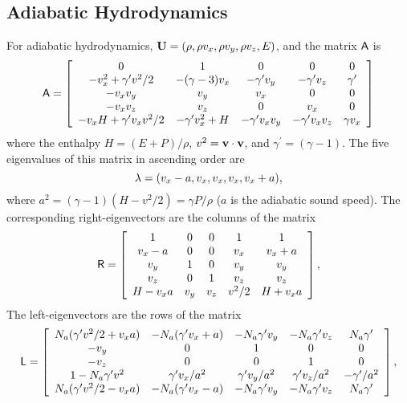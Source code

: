\subsection{Adiabatic Hydrodynamics}

For adiabatic hydrodynamics, ${\bf U} = (\rho, \rho v_{x}, \rho v_{y},
\rho v_{z}, E)$, and the matrix ${\sf A}$ is
\begin{equation}
{\sf A}  = \left[ \begin{array}{ccccc}
0 & 1 & 0 & 0 & 0 \\
-v_{x}^{2} + \gamma^{\prime}v^{2}/2 & -(\gamma -3)v_{x} & -\gamma^{\prime}v_{y} & -\gamma^{\prime}v_{z} & \gamma^{\prime} \\
-v_{x}v_{y} & v_{y} & v_{x} & 0 & 0 \\
-v_{x}v_{z} & v_{z} & 0 & v_{x} & 0 \\
-v_{x}H + \gamma^{\prime}v_{x}v^{2}/2 & -\gamma^{\prime}v_{x}^{2} + H & -\gamma^{\prime}v_{x}v_{y} & -\gamma^{\prime}v_{x}v_{z} & \gamma v_{x} \end{array} \right]
\end{equation}
where the enthalpy $H = (E+P)/\rho$, $v^{2} = {\bf v}\cdot{\bf v}$, and
$\gamma^{\prime} = (\gamma -1)$.  The five eigenvalues of this matrix
in ascending order are
\begin{equation}
{\bf \lambda} = (v_{x}-a, v_{x}, v_{x}, v_{x}, v_{x}+a),
\end{equation}
where $a^{2} = (\gamma-1)(H-v^{2}/2) = \gamma P/\rho$ ($a$ is the
adiabatic sound speed).  The corresponding right-eigenvectors are the
columns of the matrix
\begin{equation}
{\sf R}  = \left[ \begin{array}{ccccc}
1         & 0     & 0     & 1       & 1         \\ 
v_{x} - a & 0     & 0     & v_{x}   & v_{x} + a \\
v_{y}     & 1     & 0     & v_{y}   & v_{y}     \\
v_{z}     & 0     & 1     & v_{z}   & v_{z}     \\
H-v_{x}a  & v_{y} & v_{z} & v^{2}/2 & H+v_{x}a  \end{array} \right] ,
\end{equation}
The left-eigenvectors are the rows of the matrix
\begin{equation}
{\sf L} =  \left[ \begin{array}{ccccc}
N_{a}(\gamma^{\prime}v^{2}/2 + v_{x}a) & -N_{a}(\gamma^{\prime}v_{x} + a) & -N_{a}\gamma^{\prime}v_{y} & -N_{a}\gamma^{\prime}v_{z} & N_{a}\gamma^{\prime} \\
-v_{y} & 0 & 1 & 0 & 0 \\
-v_{z} & 0 & 0 & 1 & 0 \\
1-N_{a}\gamma^{\prime}v^{2} & \gamma^{\prime}v_{x}/a^{2} & \gamma^{\prime}v_{y}/a^{2} & \gamma^{\prime}v_{z}/a^{2} & -\gamma^{\prime}/a^{2} \\
N_{a}(\gamma^{\prime}v^{2}/2 - v_{x}a) & -N_{a}(\gamma^{\prime}v_{x} - a) & -N_{a}\gamma^{\prime}v_{y} & -N_{a}\gamma^{\prime}v_{z} & N_{a}\gamma^{\prime}
\end{array} \right] ,
\end{equation}
